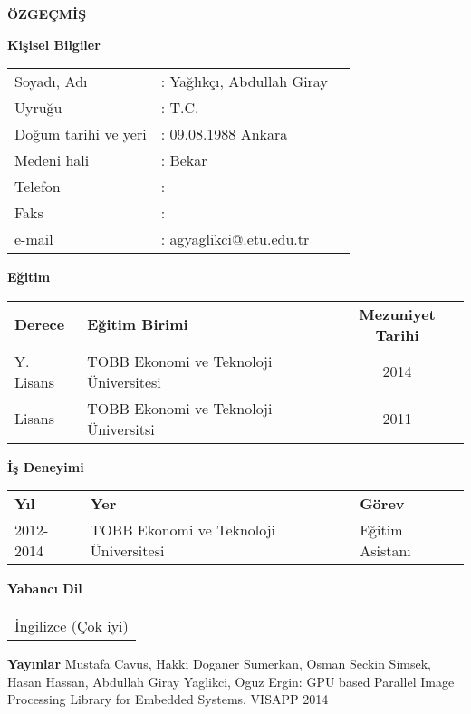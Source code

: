 \newpage
\pagestyle{plain}
\begin{center}
{\LARGE \bf \"OZGE\c{C}M\.{I}\c{S}}
\end{center}
\vspace{0.5cm}
{\bf Ki\c{s}isel Bilgiler}


\noindent
\begin{tabular}{@{}lll@{}}
Soyad{\i}, Ad{\i} & : Yağlıkçı, Abdullah Giray &\\
Uyru\u{g}u & : T.C.&\\
Do\u{g}um tarihi ve yeri & : 09.08.1988 Ankara&\\
Medeni hali & : Bekar& \\
Telefon & : &\\
Faks & : &\\
e-mail & : agyaglikci@.etu.edu.tr &\\
\end{tabular}

\vspace{0.5cm}
\noindent
{\bf E\u{g}itim}


\noindent
\begin{tabular}{@{}llc@{}}
{\bf Derece} & {\bf E\u{g}itim Birimi} & {\bf Mezuniyet Tarihi}\\
Y. Lisans & TOBB Ekonomi ve Teknoloji \"Universitesi & 2014\\
Lisans & TOBB Ekonomi ve Teknoloji \"Universitsi& 2011\\
\end{tabular}

\vspace{0.5cm}
\noindent
{\bf \.{I}\c{s} Deneyimi}


\noindent
\begin{tabular}{@{}lll@{}}
{\bf Y{\i}l} & {\bf Yer} & {\bf G\"orev}\\
2012-2014 & TOBB Ekonomi ve Teknoloji \"Universitesi & Eğitim Asistanı\\
\end{tabular}

\vspace{0.5cm}
\noindent
{\bf Yabanc{\i} Dil}


\noindent
\begin{tabular}{@{}l@{}}
\.{I}ngilizce (Çok iyi)\\
\end{tabular}


\vspace{0.5cm}
\noindent
{\bf Yay{\i}nlar} 
\noindent
Mustafa Cavus, Hakki Doganer Sumerkan, Osman Seckin Simsek, Hasan Hassan, Abdullah Giray Yaglikci, Oguz Ergin: GPU based Parallel Image Processing Library for Embedded Systems. VISAPP 2014
